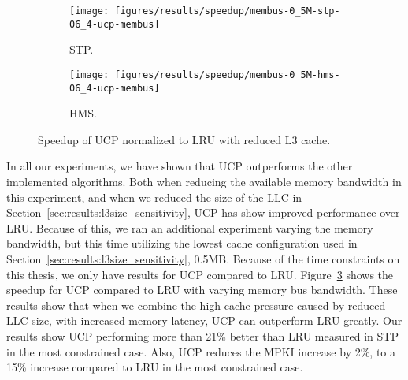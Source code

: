 \begin{figure}[t]
    \centering
        \begin{subfigure}[b]{0.5\textwidth}
            \texttt{[image: figures/results/speedup/membus-0\_5M-stp-06\_4-ucp-membus]}
            \caption{STP.}
            \label{fig:results:bus-05:ucp:stp}
        \end{subfigure}%
        \begin{subfigure}[b]{0.5\textwidth}
            \texttt{[image: figures/results/speedup/membus-0\_5M-hms-06\_4-ucp-membus]}
            \caption{HMS.}
            \label{fig:results:bus-05:ucp:hms}
        \end{subfigure}
        \caption{Speedup of UCP normalized to LRU with reduced L3 cache.}
        \label{fig:results:bus-05:ucp}
\end{figure}


In all our experiments, we have shown that UCP outperforms the other implemented algorithms.
Both when reducing the available memory bandwidth in this experiment, and when we reduced the size of the LLC in Section~\ref{sec:results:l3size_sensitivity}, UCP has show improved performance over LRU.
Because of this, we ran an additional experiment varying the memory bandwidth, but this time utilizing the lowest cache configuration used in Section~\ref{sec:results:l3size_sensitivity}, 0.5MB.
Because of the time constraints on this thesis, we only have results for UCP compared to LRU.
Figure~\ref{fig:results:bus-05:ucp} shows the speedup for UCP compared to LRU with varying memory bus bandwidth.
These results show that when we combine the high cache pressure caused by reduced LLC size, with increased memory latency, UCP can outperform LRU greatly.
Our results show UCP performing more than 21\% better than LRU measured in STP in the most constrained case.
Also, UCP reduces the MPKI increase by 2\%, to a 15\% increase compared to LRU in the most constrained case.
